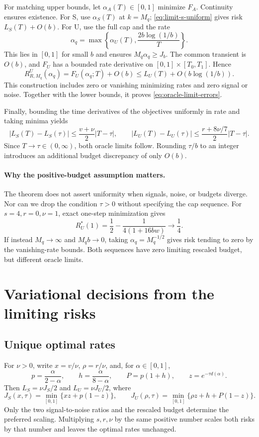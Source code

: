 \documentclass{alt2027}
\begin{document}
For matching upper bounds, let $\alpha_A(T) \in[0,1]$ minimize $F_A$. Continuity
ensures existence. For S, use $\alpha_S(T)$ at $k = M_q$;
\cref{eq:limit-s-uniform} gives risk $L_S(T) + O(b)$. For U, use the full cap
and the rate
\[
  \alpha_q = \max\left\{ \alpha_U(T),\frac{2b\log(1/b)}{T} \right\}.
\]
This lies in $[0,1]$ for small $b$ and ensures $M_q\alpha_q \geq J_b$. The
common transient is $O(b)$, and $F_U$ has a bounded rate derivative on
$[0,1] \times[T_0,T_1]$. Hence
\[
  R^U_{R,M_q}(\alpha_q) = F_U(\alpha_q;T) + O(b) \leq L_U(T) + O(b\log(1/b)).
\]
This construction includes zero or vanishing minimizing rates and zero signal or
noise. Together with the lower bounds, it proves \cref{eq:oracle-limit-errors}.

Finally, bounding the time derivatives of the objectives uniformly in rate and
taking minima yields
\[
  |L_S(T) - L_S(\tau)| \leq \frac{v + \nu}{2}|T
                            - \tau|,\qquad |L_U(T)
                            - L_U(\tau)|
                       \leq \frac{r + 8\nu/7}{2}|T - \tau|.
\]
Since $T \to \tau \in (0,\infty)$, both oracle limits follow. Rounding $\tau/b$
to an integer introduces an additional budget discrepancy of only $O(b)$.

\paragraph{Why the positive-budget assumption matters.}

The theorem does not assert uniformity when signals, noise, or budgets diverge.
Nor can we drop the condition $\tau > 0$ without specifying the cap sequence.
For $s = 4,r = 0,\nu = 1$, exact one-step minimization gives
\[
  R_U^*(1) = \frac12 - \frac{1}{4(1 + 16bw)} \longrightarrow \frac14.
\]
If instead $M_q \to \infty$ and $M_qb \to 0$, taking $\alpha_q = M_q^{-1/2}$
gives risk tending to zero by the vanishing-rate bounds. Both sequences have
zero limiting rescaled budget, but different oracle limits.

\section{Variational decisions from the limiting risks}
\label{sec:oracle-variational}

\subsection{Unique optimal rates}

For $\nu > 0$, write $x = v/\nu$, $\rho = r/\nu$, and, for $\alpha \in[0,1]$,
\[
  p = \frac{\alpha}{2 - \alpha},\qquad h
    = \frac{\alpha}{8 - \alpha},\qquad P
    = p(1 + h),\qquad z
    = e^{-\tau d(\alpha)}.
\]
Then $L_S = \nu J_S/2$ and $L_U = \nu J_U/2$, where
\begin{equation}
  J_S(x,\tau)
  = \min_{[0,1]}\{xz + p(1 - z)\},\qquad J_U(\rho,\tau)
  = \min_{[0,1]}\{\rho z + h + P(1 - z)\}. \label{eq:dimensionless-oracles}
\end{equation}
Only the two signal-to-noise ratios and the rescaled budget determine the
preferred scaling. Multiplying $s,r,\nu$ by the same positive number scales both
risks by that number and leaves the optimal rates unchanged.
\end{document}
